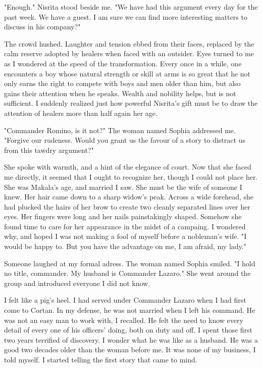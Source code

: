 \documentclass{article}
\begin{document}
"Enough." Nisrita stood beside me. "We have had this argument every day for the past week. We have a guest. I am sure we can find more interesting matters to discuss in his company?"

The crowd hushed. Laughter and tension ebbed from their faces, replaced by the calm reserve adopted by healers when faced with an outsider. Eyes turned to me as I wondered at the speed of the transformation. Every once in a while, one encounters a boy whose natural strength or skill at arms is so great that he not only earns the right to compete with boys and men older than him, but also gains their attention when he speaks. Wealth and nobility helps, but is not sufficient. I suddenly realized just how powerful Nisrita's gift must be to draw the attention of healers more than half again her age.

"Commander Romino, is it not?" The woman named Sophia addressed me. "Forgive our rudeness. Would you grant us the favour of a story to distract us from this tawdry argument?"

She spoke with warmth, and a hint of the elegance of court. Now that she faced me directly, it seemed that I ought to recognize her, though I could not place her. She was Makala's age, and married I saw. She must be the wife of someone I knew. Her hair came down to a sharp widow's peak. Across a wide forehead, she had plucked the hairs of her brow to create two cleanly separated lines over her eyes. Her fingers were long and her nails painstakingly shaped. Somehow she found time to care for her appearance in the midst of a campaing. I wondered why, and hoped I was not making a fool of myself before a nobleman's wife. "I would be happy to. But you have the advantage on me, I am afraid, my lady."

Someone laughed at my formal adress. The woman named Sophia smiled. "I hold no title, commander. My husband is Commander Lazaro." She went around the group and introduced everyone I did not know.

I felt like a pig's heel. I had served under Commander Lazaro when I had first come to Cortan. In my defense, he was not married when I left his command. He was not an easy man to work with, I recalled. He felt the need to know every detail of every one of his officers' doing, both on duty and off. I spent those first two years terrified of discovery. I wonder what he was like as a husband. He was a good two decades older than the woman before me. It was none of my business, I told myself. I started telling the first story that came to mind.
\end{document}
